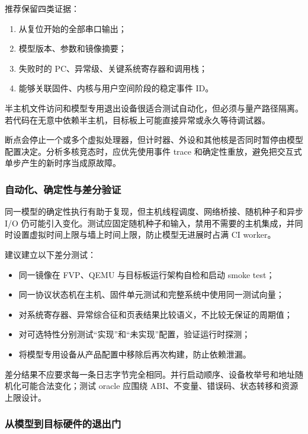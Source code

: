 推荐保留四类证据：

\begin{enumerate}
  \item 从复位开始的全部串口输出；
  \item 模型版本、参数和镜像摘要；
  \item 失败时的 PC、异常级、关键系统寄存器和调用栈；
  \item 能够关联固件、内核与用户空间阶段的稳定事件 ID。
\end{enumerate}

半主机文件访问和模型专用退出设备很适合测试自动化，但必须与量产路径隔离。若代码在无意中依赖半主机，目标板上可能直接异常或永久等待调试器。

断点会停止一个或多个虚拟处理器，但计时器、外设和其他核是否同时暂停由模型配置决定。分析多核竞态时，应优先使用事件 trace 和确定性重放，避免把交互式单步产生的新时序当成原故障。

\subsubsection{自动化、确定性与差分验证}

同一模型的确定性执行有助于复现，但主机线程调度、网络桥接、随机种子和异步 I/O 仍可能引入变化。测试应固定随机种子和输入，禁用不需要的主机集成，并同时设置虚拟时间上限与墙上时间上限，防止模型无进展时占满 CI worker。

建议建立以下差分测试：

\begin{itemize}
  \item 同一镜像在 FVP、QEMU 与目标板运行架构自检和启动 smoke test；
  \item 同一协议状态机在主机、固件单元测试和完整系统中使用同一测试向量；
  \item 对系统寄存器、异常综合征和页表结果比较语义，不比较无保证的周期值；
  \item 对可选特性分别测试“实现”和“未实现”配置，验证运行时探测；
  \item 将模型专用设备从产品配置中移除后再次构建，防止依赖泄漏。
\end{itemize}

差分结果不应要求每一条日志字节完全相同。并行启动顺序、设备枚举号和地址随机化可能合法变化；测试 oracle 应围绕 ABI、不变量、错误码、状态转移和资源上限设计。

\subsubsection{从模型到目标硬件的退出门}

